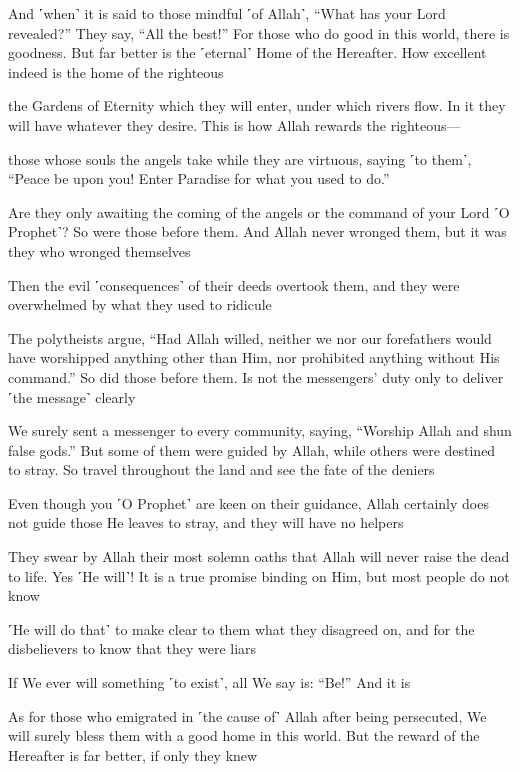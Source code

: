 And ˹when˺ it is said to those mindful ˹of Allah˺, “What has your Lord revealed?” They say, “All the best!” For those who do good in this world, there is goodness. But far better is the ˹eternal˺ Home of the Hereafter. How excellent indeed is the home of the righteous

the Gardens of Eternity which they will enter, under which rivers flow. In it they will have whatever they desire. This is how Allah rewards the righteous—

those whose souls the angels take while they are virtuous, saying ˹to them˺, “Peace be upon you! Enter Paradise for what you used to do.”

Are they only awaiting the coming of the angels or the command of your Lord ˹O Prophet˺? So were those before them. And Allah never wronged them, but it was they who wronged themselves

Then the evil ˹consequences˺ of their deeds overtook them, and they were overwhelmed by what they used to ridicule

The polytheists argue, “Had Allah willed, neither we nor our forefathers would have worshipped anything other than Him, nor prohibited anything without His command.” So did those before them. Is not the messengers’ duty only to deliver ˹the message˺ clearly

We surely sent a messenger to every community, saying, “Worship Allah and shun false gods.” But some of them were guided by Allah, while others were destined to stray. So travel throughout the land and see the fate of the deniers

Even though you ˹O Prophet˺ are keen on their guidance, Allah certainly does not guide those He leaves to stray, and they will have no helpers

They swear by Allah their most solemn oaths that Allah will never raise the dead to life. Yes ˹He will˺! It is a true promise binding on Him, but most people do not know

˹He will do that˺ to make clear to them what they disagreed on, and for the disbelievers to know that they were liars

If We ever will something ˹to exist˺, all We say is: “Be!” And it is

As for those who emigrated in ˹the cause of˺ Allah after being persecuted, We will surely bless them with a good home in this world. But the reward of the Hereafter is far better, if only they knew

